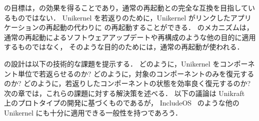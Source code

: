 \sysname の目標は，\rr の効果を得ることであり，通常の再起動との完全な互換を目指しているものではない．
Unikernel を若返りのために，Unikernel がリンクしたアプリケーションの再起動の代わりに \sysname の再起動することができる．
\sysname のメカニズムは，
通常の再起動によるソフトウェアアップデートや再構成のような他の目的に適用するものではなく，
そのような目的のためには，通常の再起動が使われる．

\sysname の設計は以下の技術的な課題を提示する．
どのように，Unikernel をコンポーネント単位で若返らせるのか?
どのように，対象のコンポーネントのみを復元するのか?
どのように，若返りしたコンポーネントの状態を効率良く復元するのか?
次の章では，これらの課題に対する解決策を述べる．
以下の議論は Unikraft~\cite{KuenzerEtAl-Unikraft} 上のプロトタイプの開発に基づくものであるが，
IncludeOS~\cite{BratterudEtAl-IncludeOS} のような他の Unikernel にも十分に適用できる一般性を持つであろう．

